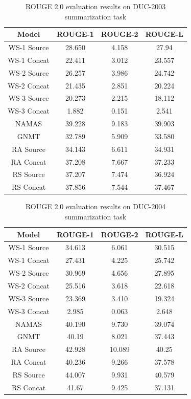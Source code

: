 \documentclass[letterpaper]{article} %
\begin{document}
\begin{table}[h]
	\begin{tabular}{c c c c}
		Model & ROUGE-1 & ROUGE-2 & ROUGE-L \\
		\hline
		WS-1 Source & 28.650 & 4.158 & 27.94 \\
		WS-1 Concat & 22.411 & 3.012 & 23.557 \\
		WS-2 Source & 26.257 & 3.986 & 24.742 \\
		WS-2 Concat & 21.435 & 2.851 & 20.224 \\
		WS-3 Source & 20.273 & 2.215 & 18.112 \\
		WS-3 Concat & 1.882 & 0.151 & 2.541 \\
		\hline
		NAMAS & 39.228 & 9.183 & 39.903 \\
		GNMT & 32.789 & 5.909 & 33.580 \\
		RA Source & 34.143 & 6.611 & 34.931 \\
		RA Concat & 37.208 & 7.667 & 37.233 \\
		RS Source & 37.207 & 7.474 & 36.924 \\
		RS Concat & 37.856 & 7.544 & 37.467 \\
	\end{tabular}
	\caption{ROUGE 2.0 evaluation results on DUC-2003 summarization task}
	\label{table:rougeduc2003}
\end{table}

\begin{table}[h]
	\begin{tabular}{c c c c}
		Model & ROUGE-1 & ROUGE-2 & ROUGE-L \\
		\hline
		WS-1 Source & 34.613 & 6.061 & 30.515 \\
		WS-1 Concat & 27.431 & 4.225 & 25.742 \\
		WS-2 Source & 30.969 & 4.656 & 27.895 \\
		WS-2 Concat & 25.516 & 3.618 & 22.618 \\
		WS-3 Source & 23.369 & 3.410 & 19.324 \\
		WS-3 Concat & 2.985 & 0.063 & 2.648 \\
		\hline
		NAMAS & 40.190 & 9.730& 39.074 \\
		GNMT & 40.19 & 8.021 & 37.443 \\
		RA Source & 42.928 & 10.089 & 40.25 \\
		RA Concat & 40.236 & 9.266 & 37.578 \\
		RS Source & 44.007 & 9.931 & 40.579 \\
		RS Concat & 41.67 & 9.425 & 37.131 \\
	\end{tabular}
	\caption{ROUGE 2.0 evaluation results on DUC-2004 summarization task}
	\label{table:rougeduc2004}
\end{table}
\end{document}
